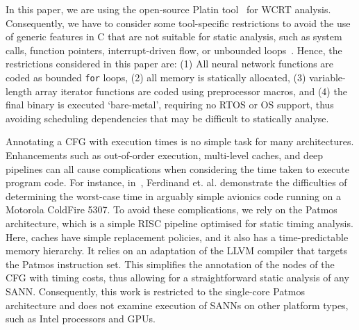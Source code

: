 In this paper, we are using the open-source Platin
tool~\cite{compiler:platin:kps15} for \ac{WCRT}
analysis. Consequently, we have to consider some tool-specific
restrictions to avoid the use of generic features in C that are not
suitable for static analysis, such as system calls, function pointers, interrupt-driven flow, or unbounded loops~\cite{RTOSWCET}.
Hence, the restrictions considered in this paper are: (1) All neural
network functions are coded as bounded \texttt{for} loops, (2) all
memory is statically allocated, (3) variable-length array iterator
functions are coded using preprocessor macros, and (4) the final binary is executed `bare-metal', requiring no
RTOS or OS support, thus avoiding scheduling dependencies
that may be difficult to statically analyse.

Annotating a \ac{CFG} with execution times is no simple task for many architectures.
Enhancements such as out-of-order execution, multi-level caches, and deep pipelines can all cause complications when considering the time taken to execute program code.
For instance, in~\cite{AirplaneWcet}, Ferdinand et. al. demonstrate the difficulties of determining the worst-case time in arguably simple avionics code running on a Motorola ColdFire 5307.
To avoid these complications, we rely on the Patmos~\cite{patmos:ppes2011} architecture, which is a simple RISC pipeline optimised for static timing analysis. 
Here, caches have simple replacement policies, and it also has a time-predictable memory hierarchy.
It relies on an adaptation of the LLVM compiler that targets the Patmos instruction set.
This simplifies the annotation of the nodes of the \ac{CFG} with
timing costs, thus allowing for a straightforward static analysis of any
\ac{SANN}. Consequently, this work is restricted to the single-core
Patmos architecture and does not examine execution of \acp{SANN} on
other platform types, such as Intel processors and GPUs.

